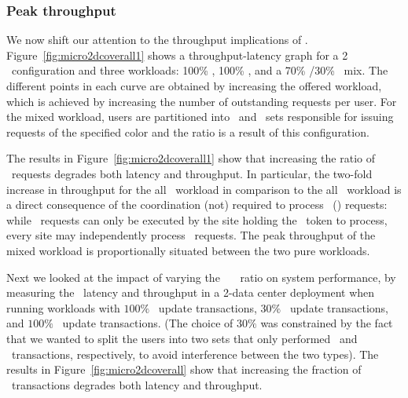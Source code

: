 \subsubsection{Peak throughput}
We now shift our attention to the throughput implications
  of \RBc.  Figure~\ref{fig:micro2dcoverall1} shows a
  throughput-latency graph for a 2 \dc\ configuration and three
  workloads: 100\% \blue, 100\% \red, and a 70\% \blue/30\% \red\ mix.
  The different points in each curve are obtained by increasing the offered
  workload, which is achieved by increasing the number of
  outstanding requests per user.  
  For the mixed workload, users are partitioned into \blue\ and
  \red\ sets responsible for issuing requests of the specified color
and the ratio is a result of this configuration.

  The results in Figure~\ref{fig:micro2dcoverall1} show that increasing the
  ratio of \red\ requests degrades both latency and throughput.
In particular, the two-fold increase in throughput for the all \blue\ workload in
 comparison to the all \red\ workload is a direct consequence of the
 coordination (not) required to process \red\ (\blue) requests:
while \red\ requests can only be executed by
the site holding the \red\ token to process,
every site may independently process
 \blue\ requests.  The peak throughput of the mixed workload is
 proportionally situated between the two pure workloads.

{Next we looked at the impact of varying the
\blue\ \shadow\ \transaction\ ratio on system performance, by
measuring the  {\transaction\ latency and throughput
  in a 2-data center deployment when running workloads with $100\%$
  \blue\ update transactions, $30\%$ \red\ update transactions, and
  $100\%$ \red\ update transactions. (The choice of $30\%$ was
  constrained by the fact that we wanted to split the users into two
  sets that only performed \blue\ and \red\ transactions,
  respectively, to avoid interference between the two types). The
  results in Figure~\ref{fig:micro2dcoverall} show that increasing the
  fraction of \red\ transactions degrades both latency and
  throughput. }
}
\fi

